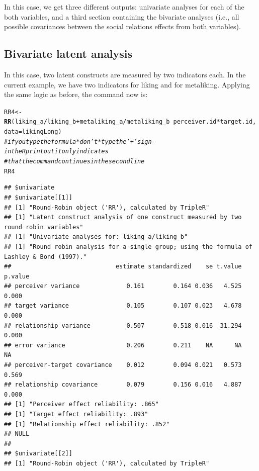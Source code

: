 \documentclass[a4paper]{article}\usepackage[]{graphicx}\usepackage[]{color}
\makeatletter
\newcommand{\hlcom}[1]{\textcolor[rgb]{0.678,0.584,0.686}{\textit{#1}}}%
\newcommand{\hlopt}[1]{\textcolor[rgb]{0,0,0}{#1}}%
\newcommand{\hlstd}[1]{\textcolor[rgb]{0.345,0.345,0.345}{#1}}%
\newcommand{\hlkwb}[1]{\textcolor[rgb]{0.69,0.353,0.396}{#1}}%
\newcommand{\hlkwc}[1]{\textcolor[rgb]{0.333,0.667,0.333}{#1}}%
\newcommand{\hlkwd}[1]{\textcolor[rgb]{0.737,0.353,0.396}{\textbf{#1}}}%
\newenvironment{kframe}{%
 \def\at@end@of@kframe{}%
 \ifinner\ifhmode%
  \def\at@end@of@kframe{\end{minipage}}%
  \begin{minipage}{\columnwidth}%
 \fi\fi%
 \def\FrameCommand##1{\hskip\@totalleftmargin \hskip-\fboxsep
 \colorbox{shadecolor}{##1}\hskip-\fboxsep
     \hskip-\linewidth \hskip-\@totalleftmargin \hskip\columnwidth}%
 \MakeFramed {\advance\hsize-\width
   \@totalleftmargin\z@ \linewidth\hsize
   \@setminipage}}%
 {\par\unskip\endMakeFramed%
 \at@end@of@kframe}
\newenvironment{knitrout}{}{} %
\makeatother
\begin{document}
In this case, we get three different outputs: univariate analyses for each of the both variables, and a third section containing the bivariate analyses (i.e., all possible covariances between the social relations effects from both variables).



\subsection{Bivariate latent analysis} %
\label{sub:bivariate_latent_analysis}
In this case, two latent constructs are measured by two indicators each. In the current example, we have two indicators for liking and for metaliking. Applying the same logic as before, the command now is:
\begin{knitrout}\small
{}\color{fgcolor}\begin{kframe}
\begin{alltt}
\hlstd{RR4} \hlkwb{<-} \hlkwd{RR}\hlstd{(liking_a}\hlopt{/}\hlstd{liking_b} \hlopt{+} \hlstd{metaliking_a}\hlopt{/}\hlstd{metaliking_b} \hlopt{~} \hlstd{perceiver.id} \hlopt{*} \hlstd{target.id,} \hlkwc{data} \hlstd{= likingLong)}
\hlcom{# if you type the formula *don't* type the '+' sign - in the R print out it only indicates}
\hlcom{# that the command continues in the second line}
\hlstd{RR4}
\end{alltt}
\begin{verbatim}
## $univariate
## $univariate[[1]]
## [1] "Round-Robin object ('RR'), calculated by TripleR"
## [1] "Latent construct analysis of one construct measured by two round robin variables"
## [1] "Univariate analyses for: liking_a/liking_b"
## [1] "Round robin analysis for a single group; using the formula of Lashley & Bond (1997)."
##                             estimate standardized    se t.value p.value
## perceiver variance             0.161        0.164 0.036   4.525   0.000
## target variance                0.105        0.107 0.023   4.678   0.000
## relationship variance          0.507        0.518 0.016  31.294   0.000
## error variance                 0.206        0.211    NA      NA      NA
## perceiver-target covariance    0.012        0.094 0.021   0.573   0.569
## relationship covariance        0.079        0.156 0.016   4.887   0.000
## [1] "Perceiver effect reliability: .865"
## [1] "Target effect reliability: .893"
## [1] "Relationship effect reliability: .852"
## NULL
## 
## $univariate[[2]]
## [1] "Round-Robin object ('RR'), calculated by TripleR"

\end{verbatim}
\end{kframe}
\end{knitrout}
\end{document}
